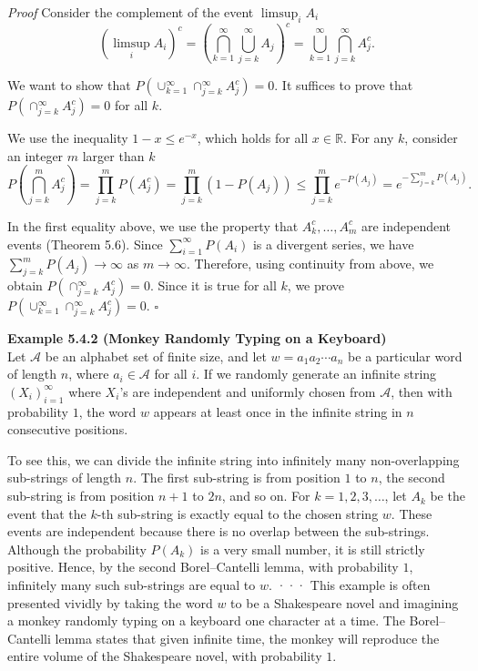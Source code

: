 \textit{Proof} Consider the complement of the event $\limsup_i A_i$
\[
(\limsup_i A_i)^c=\left(\bigcap_{k=1}^{\infty}\bigcup_{j=k}^{\infty} A_j\right)^c=\bigcup_{k=1}^{\infty}\bigcap_{j=k}^{\infty} A_j^c.
\]

We want to show that $P\left(\cup_{k=1}^{\infty}\cap_{j=k}^{\infty} A_j^c\right)=0$. It suffices to prove that $P\left(\cap_{j=k}^{\infty} A_j^c\right)=0$ for all $k$.

We use the inequality $1-x \le e^{-x}$, which holds for all $x \in \mathbb{R}$. For any $k$, consider an integer $m$ larger than $k$
\[
P\left(\bigcap_{j=k}^{m} A_j^c\right)=\prod_{j=k}^{m} P(A_j^c)=\prod_{j=k}^{m} (1-P(A_j)) \le \prod_{j=k}^{m} e^{-P(A_j)}=e^{-\sum_{j=k}^{m} P(A_j)}.
\]

In the first equality above, we use the property that $A_k^c,\ldots,A_m^c$ are independent events (Theorem 5.6). Since $\sum_{i=1}^{\infty} P(A_i)$ is a divergent series, we have $\sum_{j=k}^{m} P(A_j) \to \infty$ as $m \to \infty$. Therefore, using continuity from above, we obtain $P\left(\cap_{j=k}^{\infty} A_j^c\right)=0$. Since it is true for all $k$, we prove $P\left(\cup_{k=1}^{\infty}\cap_{j=k}^{\infty} A_j^c\right)=0$. \hfill $\square$

\textbf{Example 5.4.2 (Monkey Randomly Typing on a Keyboard)} \\
Let $\mathcal{A}$ be an alphabet set of finite size, and let $w=a_1a_2 \cdots a_n$ be a particular word of length $n$, where $a_i \in \mathcal{A}$ for all $i$. If we randomly generate an infinite string $(X_i)_{i=1}^{\infty}$ where $X_i$'s are independent and uniformly chosen from $\mathcal{A}$, then with probability $1$, the word $w$ appears at least once in the infinite string in $n$ consecutive positions.

To see this, we can divide the infinite string into infinitely many non-overlapping sub-strings of length $n$. The first sub-string is from position $1$ to $n$, the second sub-string is from position $n+1$ to $2n$, and so on. For $k=1,2,3,\ldots$, let $A_k$ be the event that the $k$-th sub-string is exactly equal to the chosen string $w$. These events are independent because there is no overlap between the sub-strings. Although the probability $P(A_k)$ is a very small number, it is still strictly positive. Hence, by the second Borel--Cantelli lemma, with probability $1$, infinitely many such sub-strings are equal to $w$.
···
This example is often presented vividly by taking the word $w$ to be a Shakespeare novel and imagining a monkey randomly typing on a keyboard one character at a time. The Borel--Cantelli lemma states that given infinite time, the monkey will reproduce the entire volume of the Shakespeare novel, with probability $1$.


